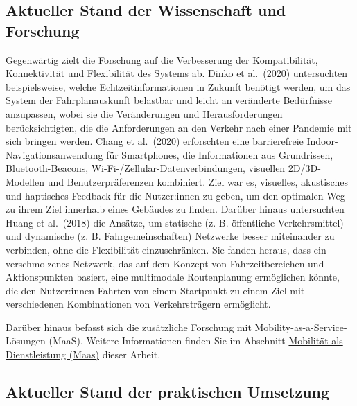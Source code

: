 \documentclass[
]{book}
\begin{document}
\hypertarget{aktueller-stand-der-wissenschaft-und-forschung-21}{%
\subsection*{Aktueller Stand der Wissenschaft und Forschung}\label{aktueller-stand-der-wissenschaft-und-forschung-21}}

Gegenwärtig zielt die Forschung auf die Verbesserung der Kompatibilität, Konnektivität und Flexibilität des Systems ab. Dinko et al.~(2020) untersuchten beispielsweise, welche Echtzeitinformationen in Zukunft benötigt werden, um das System der Fahrplanauskunft belastbar und leicht an veränderte Bedürfnisse anzupassen, wobei sie die Veränderungen und Herausforderungen berücksichtigten, die die Anforderungen an den Verkehr nach einer Pandemie mit sich bringen werden. Chang et al.~(2020) erforschten eine barrierefreie Indoor-Navigationsanwendung für Smartphones, die Informationen aus Grundrissen, Bluetooth-Beacons, Wi-Fi-/Zellular-Datenverbindungen, visuellen 2D/3D-Modellen und Benutzerpräferenzen kombiniert. Ziel war es, visuelles, akustisches und haptisches Feedback für die Nutzer:innen zu geben, um den optimalen Weg zu ihrem Ziel innerhalb eines Gebäudes zu finden. Darüber hinaus untersuchten Huang et al.~(2018) die Ansätze, um statische (z. B. öffentliche Verkehrsmittel) und dynamische (z. B. Fahrgemeinschaften) Netzwerke besser miteinander zu verbinden, ohne die Flexibilität einzuschränken. Sie fanden heraus, dass ein verschmolzenes Netzwerk, das auf dem Konzept von Fahrzeitbereichen und Aktionspunkten basiert, eine multimodale Routenplanung ermöglichen könnte, die den Nutzer:innen Fahrten von einem Startpunkt zu einem Ziel mit verschiedenen Kombinationen von Verkehrsträgern ermöglicht.

Darüber hinaus befasst sich die zusätzliche Forschung mit Mobility-as-a-Service-Lösungen (MaaS). Weitere Informationen finden Sie im Abschnitt \protect\hyperlink{maas}{Mobilität als Dienstleistung (Maas)} dieser Arbeit.

\hypertarget{aktueller-stand-der-praktischen-umsetzung-21}{%
\subsection*{Aktueller Stand der praktischen Umsetzung}\label{aktueller-stand-der-praktischen-umsetzung-21}}
\end{document}
